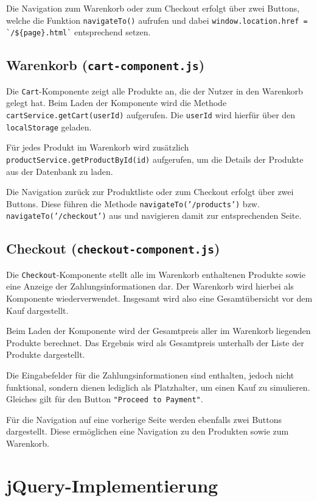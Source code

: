 \documentclass[oneside]{ausarbeitung}
\begin{document}
Die Navigation zum Warenkorb oder zum Checkout erfolgt über zwei Buttons, welche die Funktion \texttt{navigateTo()} aufrufen und dabei \texttt{window.location.href = \`{}/\$\{page\}.html\`} entsprechend setzen.


\subsection{Warenkorb (\texttt{cart-component.js})}

Die \texttt{Cart}-Komponente zeigt alle Produkte an, die der Nutzer in den Warenkorb gelegt hat. Beim Laden der Komponente wird die Methode \texttt{cartService.getCart(userId)} aufgerufen. Die \texttt{userId} wird hierfür über den \texttt{localStorage} geladen. 

Für jedes Produkt im Warenkorb wird zusätzlich \texttt{productService.getProductById(id)} aufgerufen, um die Details der Produkte aus der Datenbank zu laden.

Die Navigation zurück zur Produktliste oder zum Checkout erfolgt über zwei Buttons. Diese führen die Methode \texttt{navigateTo('/products')} bzw. \texttt{navigateTo('/checkout')} aus und navigieren damit zur entsprechenden Seite.


\subsection{Checkout (\texttt{checkout-component.js})}

Die \texttt{Checkout}-Komponente stellt alle im Warenkorb enthaltenen Produkte sowie eine Anzeige der Zahlungsinformationen dar. Der Warenkorb wird hierbei als Komponente wiederverwendet. Insgesamt wird also eine Gesamtübersicht vor dem Kauf dargestellt.

Beim Laden der Komponente wird der Gesamtpreis aller im Warenkorb liegenden Produkte berechnet. Das Ergebnis wird als Gesamtpreis unterhalb der Liste der Produkte dargestellt. 

Die Eingabefelder für die Zahlungsinformationen sind enthalten, jedoch nicht funktional, sondern dienen lediglich als Platzhalter, um einen Kauf zu simulieren. Gleiches gilt für den Button \texttt{"Proceed to Payment"}.

Für die Navigation auf eine vorherige Seite werden ebenfalls zwei Buttons dargestellt. Diese ermöglichen eine Navigation zu den Produkten sowie zum Warenkorb.


\section{jQuery-Implementierung}
\end{document}
